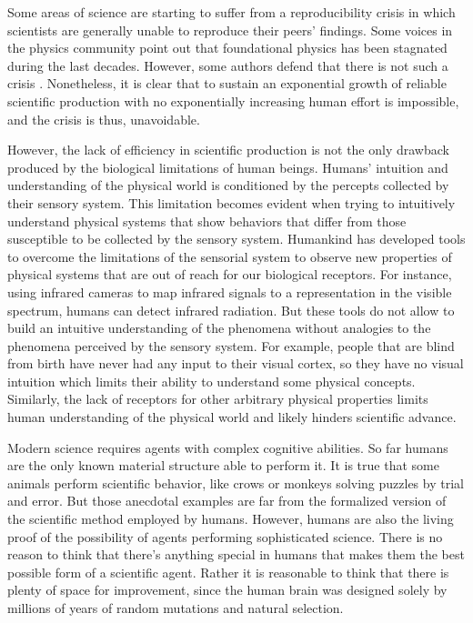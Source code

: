 \documentclass[11pt,a4paper,twoside]{report}
\newcommand{\+}{\textnormal{+} }
\theoremstyle{definition}
\numberwithin{equation}{chapter}
\begin{document}
Some areas of science are starting to suffer from a reproducibility crisis
\cite{Saltelli, begley2012raise} in which scientists are generally unable to
reproduce their peers' findings. Some voices in the physics community
\cite{Sabine} point out that foundational physics has been stagnated during the
last decades. However, some authors defend that there is not such a crisis
\cite{Fanelli2628}. Nonetheless, it is clear that to sustain an exponential
growth of reliable scientific production with no exponentially increasing human
effort is impossible, and the crisis is thus, unavoidable.
 \par
However, the lack of efficiency in scientific production is not the only
drawback produced by the biological limitations of human beings. Humans'
intuition and understanding of the physical world is conditioned by the percepts
collected by their sensory system. This limitation becomes evident when trying
to intuitively understand physical systems that show behaviors that differ from
those susceptible to be collected by the sensory system. Humankind has developed
tools to overcome the limitations of the sensorial system to observe new
properties of physical systems that are out of reach for our biological
receptors. For instance, using infrared cameras to map infrared signals to a
representation in the visible spectrum, humans can detect infrared radiation.
But these tools do not allow to build an intuitive understanding of the
phenomena without analogies to the phenomena perceived by the sensory system.
For example, people that are blind from birth have never had any input to their
visual cortex, so they have no visual intuition which limits their ability to
understand some physical concepts. Similarly, the lack of receptors for other
arbitrary physical properties limits human understanding of the physical world
and likely hinders scientific advance. \\ 
\par 
Modern science requires agents with complex cognitive abilities. So far
humans are the only known material structure able to perform it. It is true that
some animals perform scientific behavior, like crows or monkeys solving puzzles
by trial and error. But those anecdotal examples are far from the formalized
version of the scientific method employed by humans. However, humans are also
the living proof of the possibility of agents performing sophisticated science.
There is no reason to think that there's anything special in humans that makes
them the best possible form of a scientific agent. Rather it is reasonable to
think that there is plenty of space for improvement, since the human brain was
designed solely by millions of years of random mutations and natural selection.
\end{document}
